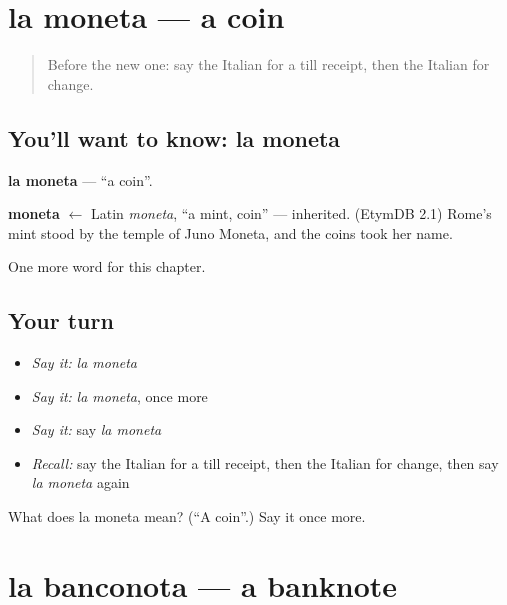 \section[la moneta]{la moneta — a coin}

\label{lesson:IT-C226-moneta}



\begin{quote}
Before the new one: say the Italian for a till receipt, then the Italian for change.
\end{quote}

\subsection*{You'll want to know: la moneta}
\textbf{la moneta} — \textquotedblleft{}a coin\textquotedblright{}.

\begin{cousinweb}
\textbf{moneta} $\leftarrow$ Latin \emph{moneta}, \textquotedblleft{}a mint, coin\textquotedblright{} — inherited. (EtymDB 2.1) Rome's mint stood by the temple of Juno Moneta, and the coins took her name.
\end{cousinweb}

\begin{grammarlens}[title={What you've built}]
One more word for this chapter.
\end{grammarlens}

\subsection*{Your turn}
\begin{itemize}
\raggedright
  \item \emph{Say it:} \emph{la moneta}
  \item \emph{Say it:} \emph{la moneta}, once more
  \item \emph{Say it:} say \emph{la moneta}
  \item \emph{Recall:} say the Italian for a till receipt, then the Italian for change, then say \emph{la moneta} again
\end{itemize}

\begin{tcolorbox}[breakable,colback=teal!4,colframe=teal!35!black,title={Before you move on}]
What does la moneta mean? (\textquotedblleft{}A coin\textquotedblright{}.) Say it once more.
\end{tcolorbox}
\section[la banconota]{la banconota — a banknote}

